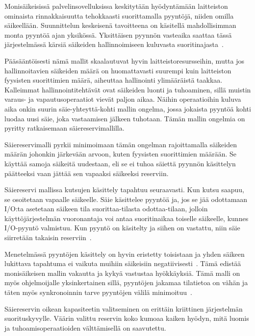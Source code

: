 \documentclass[12pt]{article}
\begin{document}
Monisäikeisissä palvelinsovelluksissa keskitytään hyödyntämään laitteiston ominaista
rinnakkaisuutta tehokkaasti suorittamalla pyyntöjä, niiden omilla säikeellään. Suunnittelun keskeisenä
tavoitteena on käsitellä mahdollisimman monta pyyntöä ajan yksikössä. Yksittäisen pyynnön
vasteaika saattaa tässä
järjestelmässä kärsiä säikeiden hallinnoimiseen kuluvasta suoritinajasta~\cite{easton_developing_2004}.

Pääsääntöisesti nämä mallit skaalautuvat hyvin laitteistoresursseihin,
mutta jos hallinnoitavien säikeiden määrä on huomattavasti suurempi kuin laitteiston
fyysisten suorittimien määrä, aiheuttaa hallinointi ylimääräistä taakkaa.
Kalleimmat hallinnointitehtävät ovat säikeiden luonti ja tuhoaminen, sillä
muistin varaus- ja vapautusoperaatiot vievät paljon aikaa.
Näihin operaatioihin kuluva aika onkin suurin säie-yhteyttä-kohti mallin
ongelma, jossa jokaista pyyntöä kohti
luodaa uusi säie, joka vastaamisen jälkeen tuhotaan.
Tämän mallin ongelmia on pyritty ratkaisemaan säiereservimallilla.

Säiereservimalli pyrkii minimoimaan tämän ongelman rajoittamalla
säikeiden määrän johonkin järkevään arvoon, kuten fyysisten suorittimien
määrään. Se käyttää samoja säikeitä uudestaan, eli se ei tuhoa säiettä
pyynnön käsittelyn päätteeksi vaan jättää sen vapaaksi säikeeksi reserviin.

Säiereservi mallissa kutsujen käsittely tapahtuu seuraavasti.
Kun kutsu saapuu, se osoitetaan vapaalle säikeelle. Säie käsittelee pyyntöä ja,
jos se jää odottamaan I/O:ta asetetaan säikeen tila suorittaa-tilasta odottaa-tilaan,
jolloin käyttöjärjestelmän vuoronantaja voi antaa suoritinaikaa toiselle säikeelle,
kunnes I/O-pyyntö valmistuu. Kun pyyntö on käsitelty ja siihen on vastattu, niin
säie siirretään takaisin reserviin~\cite{ling_analysis_2000}.

Menetelmässä pyyntöjen käsittely on hyvin eristetty toisistaan ja
yhden säikeen lukittava tapahtuma ei vaikuta muihiin säikeisiin negatiivisesti~\cite{davis_case_2017}.
Tämä edistää monisäikeisen mallin vakautta ja kykyä vastustaa hyökkäyksiä.
Tämä malli on myös ohjelmoijalle yksinkertainen sillä, pyyntöjen jakamaa tilatietoa
on vähän ja täten myös synkronoinnin tarve pyyntöjen välilä minimoituu~\cite{hu_applying_1998}.

Säiereservin oikean kapasiteetin valitseminen on erittäin kriittinen 
järjestelmän suorituskyvylle.
Väärin valittu reservin koko kumoaa kaiken hyödyn, mitä luomis
ja tuhoamisoperaatioiden välttämisellä on saavutettu.
\end{document}
